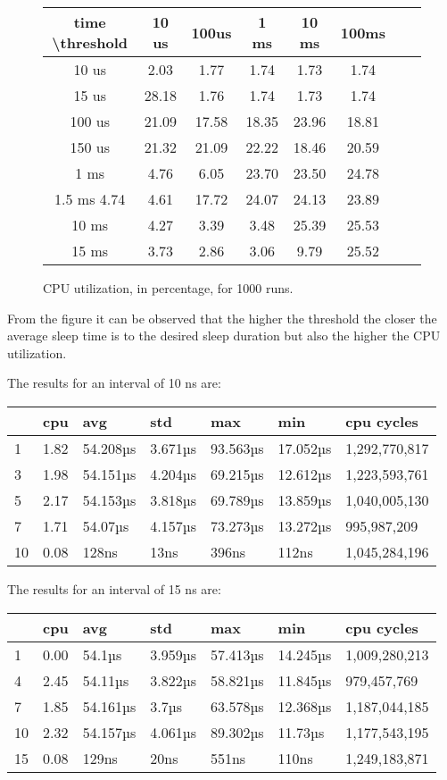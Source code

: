 \documentclass{article}
\begin{document}
{\begin{figure}
\begin{tabular}{|c|c|c|c|c|c|c|c|}
\hline
time \textbackslash threshold & 10 us& 100us & 1 ms& 10 ms & 100ms\\
\hline
10 us & 2.03 & 1.77 &  1.74 & 1.73 & 1.74 \\
15 us & 28.18 & 1.76 & 1.74 & 1.73 &  1.74 \\
100 us & 21.09 &  17.58 & 18.35 & 23.96 & 18.81 \\
150 us & 21.32 & 21.09 &  22.22 & 18.46 &  20.59 \\
1 ms & 4.76 & 6.05 & 23.70 & 23.50 & 24.78 \\
1.5 ms 4.74 & 4.61 & 17.72 &  24.07 &  24.13 & 23.89 \\
10 ms & 4.27 &  3.39 &  3.48 & 25.39 &  25.53 \\
15 ms & 3.73 & 2.86 &  3.06 &  9.79 & 25.52 \\

\hline
\end{tabular}
\caption{CPU utilization, in percentage, for 1000 runs.}
\end{figure}


From the figure it can be observed that the higher the threshold the closer the average sleep time is to the desired sleep duration but also the higher the CPU utilization.
}

The results for an interval of 10 ns are: \\
\begin{tabular}{lllllll}
\toprule
 & cpu & avg & std & max & min & cpu cycles \\
\midrule
1 & 1.82 & 54.208µs & 3.671µs & 93.563µs & 17.052µs & 1,292,770,817 \\
3 & 1.98 & 54.151µs & 4.204µs & 69.215µs & 12.612µs & 1,223,593,761 \\
5 & 2.17 & 54.153µs & 3.818µs & 69.789µs & 13.859µs & 1,040,005,130 \\
7 & 1.71 & 54.07µs & 4.157µs & 73.273µs & 13.272µs & 995,987,209 \\
10 & 0.08 & 128ns & 13ns & 396ns & 112ns & 1,045,284,196 \\
\bottomrule
\end{tabular}


The results for an interval of 15 ns are: \\
\begin{tabular}{lllllll}
\toprule
 & cpu & avg & std & max & min & cpu cycles \\
\midrule
1 & 0.00 & 54.1µs & 3.959µs & 57.413µs & 14.245µs & 1,009,280,213 \\
4 & 2.45 & 54.11µs & 3.822µs & 58.821µs & 11.845µs & 979,457,769 \\
7 & 1.85 & 54.161µs & 3.7µs & 63.578µs & 12.368µs & 1,187,044,185 \\
10 & 2.32 & 54.157µs & 4.061µs & 89.302µs & 11.73µs & 1,177,543,195 \\
15 & 0.08 & 129ns & 20ns & 551ns & 110ns & 1,249,183,871 \\
\bottomrule
\end{tabular}
\end{document}
